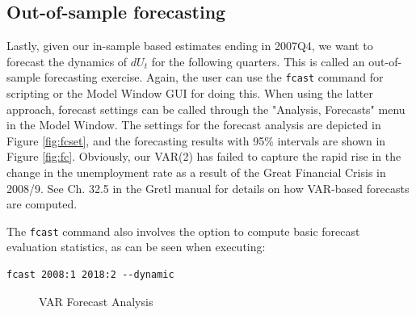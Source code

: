 \documentclass[11pt]{article}
\begin{document}
\subsection{Out-of-sample forecasting}
Lastly, given our in-sample based estimates ending in 2007Q4, we want to forecast the dynamics of $ dU_t $ for the following quarters. This is called an out-of-sample forecasting exercise. Again, the user can use the \texttt{fcast} command for scripting or the Model Window GUI for doing this. When using the latter approach, forecast settings can be called through the "Analysis, Forecasts" menu in the Model Window. The settings for the forecast analysis are depicted in Figure \ref{fig:fcset}, and the forecasting results with 95\% intervals are shown in Figure \ref{fig:fc}. Obviously, our VAR(2) has failed to capture the rapid rise in the change in the unemployment rate as a result of the Great Financial Crisis in 2008/9. See Ch. 32.5 in the Gretl manual for details on how VAR-based forecasts are computed.

The \texttt{fcast} command also involves the option to compute basic forecast evaluation statistics, as can be seen when executing:
\begin{Verbatim}[baselinestretch=0.75, fontsize=\small]
fcast 2008:1 2018:2 --dynamic
\end{Verbatim}


\begin{figure}[h!]
	\centering
	\caption{VAR Forecast Analysis}
	\label{fig:FC}
\end{figure}
\end{document}
